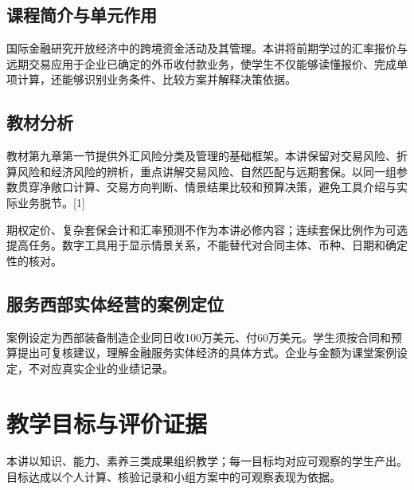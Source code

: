 \documentclass[lang=cn,11pt,oneside,openany,chinesefont=nofont,color=blue,titlestyle=hang]{elegantbook}
\begin{document}
\subsection*{课程简介与单元作用}

国际金融研究开放经济中的跨境资金活动及其管理。本讲将前期学过的汇率报价与远期交易应用于企业已确定的外币收付款业务，使学生不仅能够读懂报价、完成单项计算，还能够识别业务条件、比较方案并解释决策依据。

\subsection*{教材分析}

教材第九章第一节提供外汇风险分类及管理的基础框架。本讲保留对交易风险、折算风险和经济风险的辨析，重点讲解交易风险、自然匹配与远期套保。以同一组参数贯穿净敞口计算、交易方向判断、情景结果比较和预算决策，避免工具介绍与实际业务脱节。[1]

期权定价、复杂套保会计和汇率预测不作为本讲必修内容；连续套保比例作为可选提高任务。数字工具用于显示情景关系，不能替代对合同主体、币种、日期和确定性的核对。

\subsection*{服务西部实体经营的案例定位}

案例设定为西部装备制造企业同日收100万美元、付60万美元。学生须按合同和预算提出可复核建议，理解金融服务实体经济的具体方式。企业与金额为课堂案例设定，不对应真实企业的业绩记录。

\clearpage

\section{教学目标与评价证据}\label{sec:g3}

本讲以知识、能力、素养三类成果组织教学；每一目标均对应可观察的学生产出。目标达成以个人计算、核验记录和小组方案中的可观察表现为依据。
\end{document}
